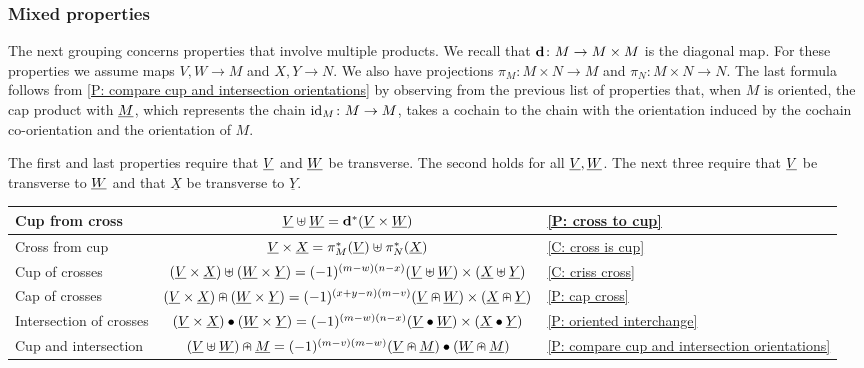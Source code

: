 \subsubsection{Mixed properties}\label{S: mixed formulas}




The next grouping concerns properties that involve multiple products. We recall that $\mathbf{d} \colon M \to M \times M$ is the diagonal map. For these properties we assume maps $V,W \to M$ and $X,Y \to N$. We also have projections $\pi_M \colon M \times N \to M$ and $\pi_N \colon M \times N \to N$. The last formula follows from \cref{P: compare cup and intersection orientations} by observing from the previous list of properties that, when $M$ is oriented, the cap product with $\underline{M}$, which represents the chain $\mathrm{id}_M \colon M \to M$, takes a cochain to the chain with the orientation induced by the cochain co-orientation and the orientation of $M$.

The first and last properties require that $\underline{V}$ and $\underline{W}$ be transverse. The second holds for all $\underline{V}, \underline{W}$. The next three require that $\underline{V}$ be transverse to $\underline{W}$ and that $\underline{X}$ be transverse to $\underline{Y}$.

\bigskip

\begin{minipage}{\linewidth}
\centering



\begin{tabular}{|l|c|l|}
\hline
Cup from cross& $\underline{V}\uplus \underline{W} = \mathbf{d}^*(\underline{V} \times \underline{W})$&\cref{P: cross to cup}	\\
\hline
Cross from cup&$\underline{V} \times \underline{X} = \pi_M^*(\underline{V})\uplus\pi_N^*(\underline{X})$& \cref{C: cross is cup}	\\
\hline
Cup of crosses&$(\underline{V} \times \underline{X})\uplus (\underline{W} \times \underline{Y}) = (-1)^{(m-w)(n-x)} (\underline{V}\uplus \underline{W}) \times (\underline{X}\uplus \underline{Y})$ &	\cref{C: criss cross}\\
\hline
Cap of crosses &$(\underline{V} \times \underline{X})\nplus (\underline{W} \times \underline{Y}) = (-1)^{(x+y-n)(m-v)} (\underline{V} \nplus \underline{W}) \times (\underline{X}\nplus \underline{Y})$ & \cref{P: cap cross}\\
\hline
Intersection of crosses &$(\underline{V} \times \underline{X})\bullet (\underline{W} \times \underline{Y}) = (-1)^{(m-w)(n-x)}(\underline{V}\bullet \underline{W}) \times (\underline{X}\bullet \underline{Y})$&\cref{P: oriented interchange}\\
\hline
Cup and intersection &$(\underline{V}\uplus \underline{W})\nplus \underline{M} = (-1)^{(m-v)(m-w)}(\underline{V}\nplus \underline{M})\bullet(\underline{W}\nplus \underline{M})$&\cref{P: compare cup and intersection orientations}\\
\hline
\end{tabular}
\end{minipage}

